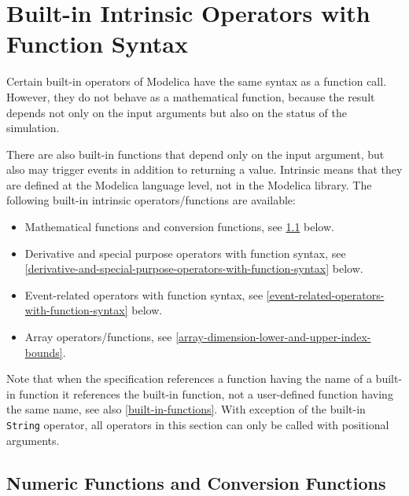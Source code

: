\section{Built-in Intrinsic Operators with Function Syntax}\label{built-in-intrinsic-operators-with-function-syntax}

Certain built-in operators of Modelica have the same syntax as a function call.
However, they do not behave as a mathematical function, because the result depends not only on the input arguments but also on the status of the simulation.

There are also built-in functions that depend only on the input argument, but also may trigger events in addition to returning a value.
Intrinsic means that they are defined at the Modelica language level, not in the Modelica library.
The following built-in intrinsic operators/functions are available:
\begin{itemize}
\item
  Mathematical functions and conversion functions, see \cref{numeric-functions-and-conversion-functions} below.
\item
  Derivative and special purpose operators with function syntax, see \cref{derivative-and-special-purpose-operators-with-function-syntax} below.
\item
  Event-related operators with function syntax, see \cref{event-related-operators-with-function-syntax} below.
\item
  Array operators/functions, see \cref{array-dimension-lower-and-upper-index-bounds}.
\end{itemize}

Note that when the specification references a function having the name of a built-in function it references the built-in function, not a user-defined function having the same name, see also \cref{built-in-functions}.
With exception of the built-in \lstinline!String! operator, all operators in this section can only be called with positional arguments.

\subsection{Numeric Functions and Conversion Functions}\label{numeric-functions-and-conversion-functions}

